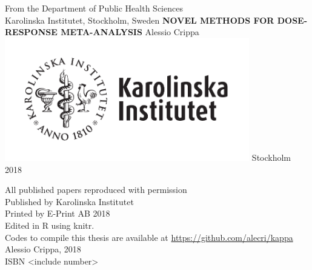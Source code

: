\documentclass[11pt,a4paper,twoside,openany]{book}\usepackage{knitr}
\begin{document}
\frontmatter
\pagestyle{nothing}

%

\begin{titlepage}
\begin{center}
\large
From the Department of Public Health Sciences \\
Karolinska Institutet, Stockholm, Sweden        
\vfill
\Large
\textbf{\textsf{NOVEL METHODS FOR DOSE-RESPONSE META-ANALYSIS}}
\vfill
\Large
Alessio Crippa
\vfill
\includegraphics[width=0.8\textwidth]{figures/ki-logo_pos}
\vfill
\large
Stockholm 2018        
\end{center}
\restoregeometry
\end{titlepage}

\newpage
\null
\vfill
\noindent All published papers reproduced with permission \\
Published by Karolinska Institutet \\
\bigskip
Printed by E-Print AB 2018 \\
Edited in R using knitr. \\
Codes to compile this thesis are available at \url{https://github.com/alecri/kappa} \\
\textcopyright Alessio Crippa, 2018 \\
ISBN <include number>
\newpage
\end{document}
